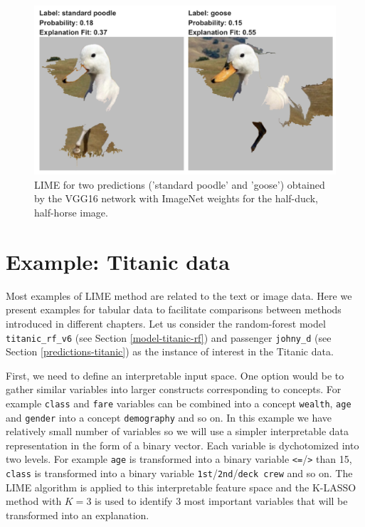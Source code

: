 \documentclass[]{krantz}
\begin{document}
\begin{figure}

{\centering \includegraphics[width=1\linewidth]{figure/duck_horse_04} 

}

\caption{LIME for two predictions ('standard poodle' and 'goose') obtained by the VGG16 network with ImageNet weights for the half-duck, half-horse image.}\label{fig:duckHorse04}
\end{figure}

\hypertarget{LIMEExample}{%
\section{Example: Titanic data}\label{LIMEExample}}

Most examples of LIME method are related to the text or image data. Here we present examples for tabular data to facilitate comparisons between methods introduced in different chapters.
Let us consider the random-forest model \texttt{titanic\_rf\_v6} (see Section \ref{model-titanic-rf}) and passenger \texttt{johny\_d} (see Section \ref{predictions-titanic}) as the instance of interest in the Titanic data.

First, we need to define an interpretable input space. One option would be to gather similar variables into larger constructs corresponding to concepts. For example \texttt{class} and \texttt{fare} variables can be combined into a concept \texttt{wealth}, \texttt{age} and \texttt{gender} into a concept \texttt{demography} and so on. In this example we have relatively small number of variables so we will use a simpler interpretable data representation in the form of a binary vector. Each variable is dychotomized into two levels. For example \texttt{age} is transformed into a binary variable \texttt{\textless{}=}/\texttt{\textgreater{}} than 15, \texttt{class} is transformed into a binary variable \texttt{1st}/\texttt{2nd}/\texttt{deck\ crew} and so on.
The LIME algorithm is applied to this interpretable feature space and the K-LASSO method with \(K=3\) is used to identify 3 most important variables that will be transformed into an explanation.
\end{document}
